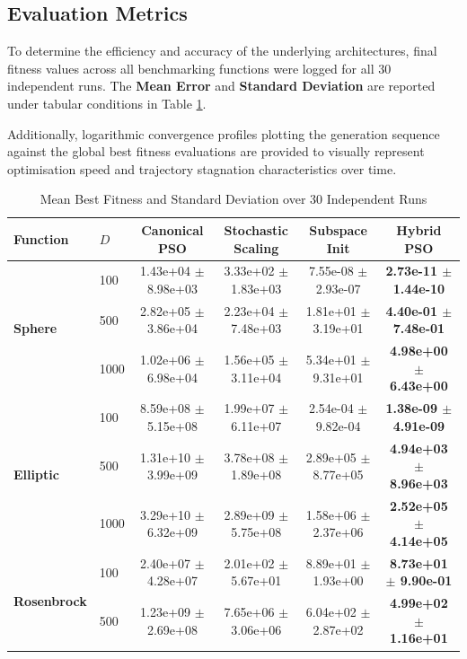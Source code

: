 \documentclass[conference]{IEEEtran}
\begin{document}
\subsection{Evaluation Metrics}
    To determine the efficiency and accuracy of the underlying architectures, final fitness values across all benchmarking functions were logged 
    for all $30$ independent runs. The \textbf{Mean Error} and \textbf{Standard Deviation} are reported under tabular conditions in Table \ref{tab:results}.
    
    Additionally, logarithmic convergence profiles plotting the generation sequence against the global best fitness evaluations are provided to 
    visually represent optimisation speed and trajectory stagnation characteristics over time.

\begin{table}[htbp]
\centering
\caption{Mean Best Fitness and Standard Deviation over 30 Independent Runs}
\label{tab:results}
\begin{tabular}{llcccc}
\toprule
\textbf{Function} & \textbf{$D$} & \textbf{Canonical PSO} & \textbf{Stochastic Scaling} & \textbf{Subspace Init} & \textbf{Hybrid PSO} \\
\midrule
\multirow{3}{*}{\textbf{Sphere}} & 100 & 1.43e+04 $\pm$ 8.98e+03 & 3.33e+02 $\pm$ 1.83e+03 & 7.55e-08 $\pm$ 2.93e-07 & \textbf{2.73e-11 $\pm$ 1.44e-10} \\
 & 500 & 2.82e+05 $\pm$ 3.86e+04 & 2.23e+04 $\pm$ 7.48e+03 & 1.81e+01 $\pm$ 3.19e+01 & \textbf{4.40e-01 $\pm$ 7.48e-01} \\
 & 1000 & 1.02e+06 $\pm$ 6.98e+04 & 1.56e+05 $\pm$ 3.11e+04 & 5.34e+01 $\pm$ 9.31e+01 & \textbf{4.98e+00 $\pm$ 6.43e+00} \\
\midrule
\multirow{3}{*}{\textbf{Elliptic}} & 100 & 8.59e+08 $\pm$ 5.15e+08 & 1.99e+07 $\pm$ 6.11e+07 & 2.54e-04 $\pm$ 9.82e-04 & \textbf{1.38e-09 $\pm$ 4.91e-09} \\
 & 500 & 1.31e+10 $\pm$ 3.99e+09 & 3.78e+08 $\pm$ 1.89e+08 & 2.89e+05 $\pm$ 8.77e+05 & \textbf{4.94e+03 $\pm$ 8.96e+03} \\
 & 1000 & 3.29e+10 $\pm$ 6.32e+09 & 2.89e+09 $\pm$ 5.75e+08 & 1.58e+06 $\pm$ 2.37e+06 & \textbf{2.52e+05 $\pm$ 4.14e+05} \\
\midrule
\multirow{3}{*}{\textbf{Rosenbrock}} & 100 & 2.40e+07 $\pm$ 4.28e+07 & 2.01e+02 $\pm$ 5.67e+01 & 8.89e+01 $\pm$ 1.93e+00 & \textbf{8.73e+01 $\pm$ 9.90e-01} \\
 & 500 & 1.23e+09 $\pm$ 2.69e+08 & 7.65e+06 $\pm$ 3.06e+06 & 6.04e+02 $\pm$ 2.87e+02 & \textbf{4.99e+02 $\pm$ 1.16e+01} \\

\end{tabular}
\end{table}
\end{document}
